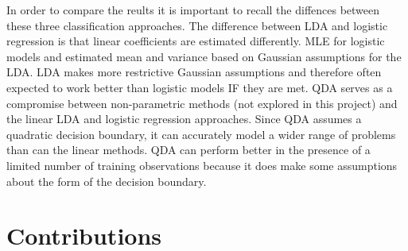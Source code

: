 \documentclass[]{article}
\begin{document}
In order to compare the reults it is important to recall the diffences
between these three classification approaches. The difference between
LDA and logistic regression is that linear coefficients are estimated
differently. MLE for logistic models and estimated mean and variance
based on Gaussian assumptions for the LDA. LDA makes more restrictive
Gaussian assumptions and therefore often expected to work better than
logistic models IF they are met. QDA serves as a compromise between
non-parametric methods (not explored in this project) and the linear LDA
and logistic regression approaches. Since QDA assumes a quadratic
decision boundary, it can accurately model a wider range of problems
than can the linear methods. QDA can perform better in the presence of a
limited number of training observations because it does make some
assumptions about the form of the decision boundary.

\section{Contributions}\label{contributions}
\end{document}
